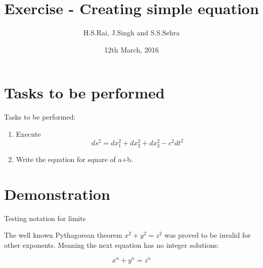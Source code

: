 \documentclass{article}
\title{Exercise - Creating simple equation}
\author{H.S.Rai, J.Singh and S.S.Sehra}
\date{12th March, 2016}
\begin{document}
	\maketitle
	
	\section*{Tasks to be performed}
	Tasks to be performed:
	\begin{enumerate}
		\item Execute \[ ds^2 = dx_1^2 + dx_2^2 + dx_3^2 - c^2 dt^2 \]
		\item Write the equation for square of a+b.
	\end{enumerate}
	\section*{Demonstration}
Testing notation for limits
 

 
	
	
The well known Pythagorean theorem \(x^2 + y^2 = z^2\) was 
proved to be invalid for other exponents. 
Meaning the next equation has no integer solutions:

\[ x^n + y^n = z^n \]
\end{document}

